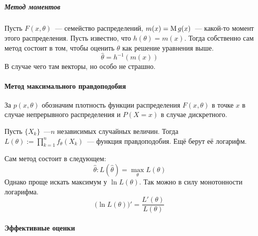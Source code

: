 \documentclass[12pt,timbord]{../../../notes}
\begin{document}
\subparagraph{}
\subparagraph{Метод моментов}

\begin{defn}\label{defn:stat:mom:method}

  Пусть $F(x,\theta)$~--- семейство распределений, $m(x) = \operatorname{M} g(x)$~--- какой-то момент этого
  распределения. Пусть известно, что $h(\theta) = m(x)$. Тогда собственно сам метод состоит в том,
  чтобы оценить $\theta$ как решение уравнения выше.
  \[
    \hat \theta = h^{-1} (m(x))
  \]
  В случае чего там векторы, но особо не страшно.

\end{defn}

\begin{exmp}\label{exmp:stat::mom::norm}
\end{exmp}

\paragraph{Метод максимального правдоподобия}
\label{par:stat::maklike}

\begin{defn}\label{defn:stat::maxlike::dens}
  За $p(x,\theta) $ обозначим плотность функции распределения $F(x,\theta)$ в точке $x$ в случае
  непрерывного распределения и $P(X=x)$ в случае дискретного.
\end{defn}
\begin{defn}\label{defn:stat::maxlike::fun}
  Пусть $\{X_k\}$~---$n$ независимых случайных величин. Тогда
  $\displaystyle L(\theta):= \prod_{k=1}^n f_\theta(X_k)$~--- функция правдоподобия.
  Ещё берут её логарифм.
\end{defn}

\begin{defn}\label{defn:stat::maxlike::method}
  Сам метод состоит в следующем:
  \[
    \hat \theta \colon L(\hat \theta) = \max_\theta L (\theta)
  \]
  Однако проще искать максимум у $\ln L(\theta)$. Так можно в силу монотонности логарифма.
  \[
    \bigl( \ln L (\theta)\bigr)' = \frac{L'(\theta)}{L(\theta)} 
  \]
\end{defn}



\paragraph*{Эффективные оценки}\label{par:stat::eff}
\end{document}
